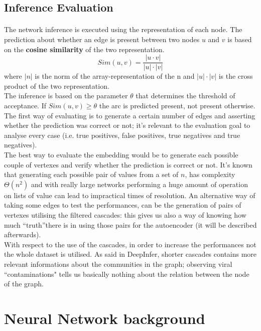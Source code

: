 \documentclass{article}
\begin{document}
		\subsection{Inference Evaluation}
			\paragraph{}
			The network inference is executed using the representation of each node. The prediction about whether an edge is present between two nodes $u$ and $v$ is based on the \textbf{cosine similarity} of the two representation.
			$$ Sim(u,v) = \frac{|u\cdot v|}{|u|\cdot |v|} $$
			where $|n|$ is the norm of the array-representation of the n and $|u|\cdot |v|$ is the cross product of the two representation.\\
			The inference is based on the parameter $\theta$ that determines the threshold of acceptance. If $Sim(u,v) \ge \theta$ the arc is predicted present, not present otherwise.\\
			The first way of evaluating is to generate a certain number of edges and asserting whether the prediction was correct or not; it's relevant to the evaluation goal to analyse every case (i.e. true positives, false positives, true negatives and true negatives).\\
			The best way to evaluate the embedding would be to generate each possible couple of vertexes and verify whether the prediction is correct or not. It's known that generating each possible pair of values from a set of $n$, has complexity $\Theta(n^{2})$ and with really large networks performing a huge amount of operation on lists of value can lead to impractical times of resolution.
			An alternative way of taking some edges to test the performances, can be the generation of pairs of vertexes utilising the filtered cascades: this gives us also a way of knowing how much \textquotedblleft truth\textquotedblright there is in using those pairs for the autoencoder (it will be described afterwards).
			\medskip\\

			With respect to the use of the cascades, in order to increase the performances not the whole dataset is utilised. As said in DeepInfer, shorter cascades contains more relevant informations about the communities in the graph; observing viral \textquotedblleft contaminations" tells us basically nothing about the relation between the node of the graph. \\
			\newpage
			
		\section{Neural Network background}
\end{document}
